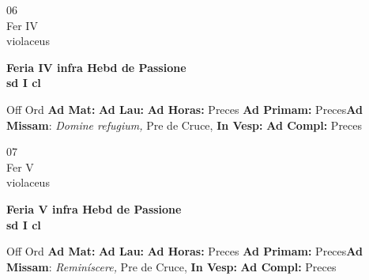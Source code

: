 \documentclass[10pt, openany]{book}
\begin{document}
    \begin{center}
        \begin{minipage}{3.5in}
            \vspace{2em}
            \begin{minipage}{0.5in}
                {\Huge 06} \\
                {\normalsize Fer IV} \\
                {\normalsize violaceus}
            \end{minipage}
            \begin{minipage}{3.0in}
                \textbf{ \large Feria IV infra Hebd de Passione \\
                \textnormal{\normalsize sd I cl}} \\ 
            \end{minipage}
            \begin{justify}Off Ord
                \textbf{Ad Mat: }
                \textbf{Ad Lau: }
                \textbf{Ad Horas: }Preces
                \textbf{Ad Primam: }Preces\textbf{Ad Missam}: \textit{Domine refugium,} Pre de Cruce,  
                \textbf{In Vesp: }
                \textbf{Ad Compl: }Preces
            \end{justify}
        \end{minipage}
    \end{center}

    \begin{center}
        \begin{minipage}{3.5in}
            \vspace{2em}
            \begin{minipage}{0.5in}
                {\Huge 07} \\
                {\normalsize Fer V} \\
                {\normalsize violaceus}
            \end{minipage}
            \begin{minipage}{3.0in}
                \textbf{ \large Feria V infra Hebd de Passione \\
                \textnormal{\normalsize sd I cl}} \\ 
            \end{minipage}
            \begin{justify}Off Ord
                \textbf{Ad Mat: }
                \textbf{Ad Lau: }
                \textbf{Ad Horas: }Preces
                \textbf{Ad Primam: }Preces\textbf{Ad Missam}: \textit{Reminíscere,} Pre de Cruce,  
                \textbf{In Vesp: }
                \textbf{Ad Compl: }Preces
            \end{justify}
        \end{minipage}
    \end{center}
\end{document}
